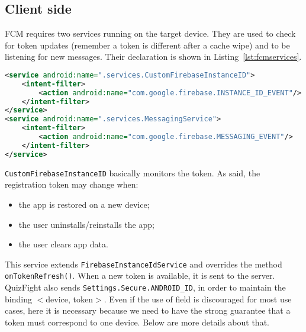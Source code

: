 \subsection{Client side}
FCM requires two services running on the target device. They are used to check for token updates (remember a token is different after a cache wipe) and to be listening for new messages. Their declaration is shown in Listing~\ref{lst:fcmservices}.
\begin{lstlisting}[language=xml, caption={FCM Services}, label={lst:fcmservices}]
<service android:name=".services.CustomFirebaseInstanceID">
	<intent-filter>
		<action android:name="com.google.firebase.INSTANCE_ID_EVENT"/>
	</intent-filter>
</service>
<service android:name=".services.MessagingService">
	<intent-filter>
		<action android:name="com.google.firebase.MESSAGING_EVENT"/>
	</intent-filter>
</service>
\end{lstlisting}

\texttt{CustomFirebaseInstanceID} basically monitors the token. As said, the registration token may change when:
\begin{itemize}
	\item the app is restored on a new device;
	\item the user uninstalls/reinstalls the app;
	\item the user clears app data.
\end{itemize}
This service extends \texttt{FirebaseInstanceIdService} and overrides the method \texttt{onTokenRefresh()}. When a new token is available, it is sent to the server. QuizFight also sends \texttt{Settings.Secure.ANDROID\_ID}, in order to maintain the binding $<$device, token$>$. Even if the use of field is discouraged for most use cases, here it is necessary because we need to have the strong guarantee that a token must correspond to one device. Below are more details about that.

